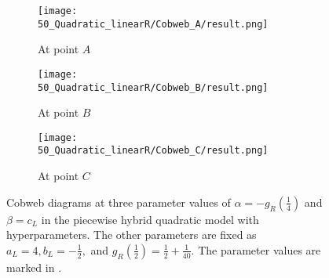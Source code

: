 \begin{figure}
	\centering
	\begin{subfigure}{0.3\textwidth}
		\centering
		\texttt{[image: 50\_Quadratic\_linearR/Cobweb\_A/result.png]}
		\caption{At point $A$}
		\label{fig:setup.arch.cobweb.A}
	\end{subfigure}
	\begin{subfigure}{0.3\textwidth}
		\centering
		\texttt{[image: 50\_Quadratic\_linearR/Cobweb\_B/result.png]}
		\caption{At point $B$}
		\label{fig:setup.arch.cobweb.B}
	\end{subfigure}
	\begin{subfigure}{0.3\textwidth}
		\centering
		\texttt{[image: 50\_Quadratic\_linearR/Cobweb\_C/result.png]}
		\caption{At point $C$}
		\label{fig:setup.arch.cobweb.C}
	\end{subfigure}
	\caption[Cobwebs of the piecewise hybrid quadratic model with hyperparameters]{
		Cobweb diagrams at three parameter values of $\alpha = -g_R\left(\frac{1}{4}\right)$ and $\beta = c_L$ in the piecewise hybrid quadratic model with hyperparameters.
		The other parameters are fixed as $a_L = 4, b_L = -\frac{1}{2},$ and $g_R\left(\frac{1}{2}\right) = \frac{1}{2} + \frac{1}{40}$.
		The parameter values are marked in .
	}
	\label{fig:setup.arch.cobwebs}
\end{figure}
